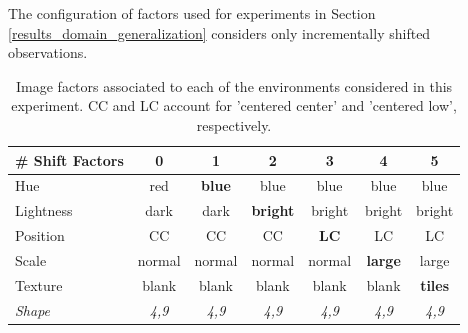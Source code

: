 \begin{definition}
    The configuration of factors used for experiments in Section \ref{results_domain_generalization}
    considers only incrementally shifted observations.

    \begin{table}[H]
        \centering
        \begin{tabular}{l|c|c|c|c|c|c}
        \# Shift Factors & 0 & 1 & 2 & 3 & 4 & 5 \\
        \midrule
        Hue & red & \textbf{blue} & blue & blue & blue & blue \\
        Lightness & dark & dark & \textbf{bright} & bright & bright & bright \\
        Position  & CC & CC & CC & \textbf{LC} & LC & LC \\
        Scale  & normal & normal & normal & normal & \textbf{large} & large \\
        Texture & blank & blank & blank & blank & blank & \textbf{tiles} \\
        \textit{Shape} & \textit{4,9} &  \textit{4,9} &  \textit{4,9} & \textit{4,9} & \textit{4,9} & \textit{4,9} \\
        \bottomrule
        \end{tabular}
        \caption{
        Image factors associated to each of the environments considered in this experiment. CC and LC account
        for 'centered center' and 'centered low', respectively.
        }
        \label{tab:data_shift_table}
    \end{table}
\end{definition}




 \cleardoublepage


